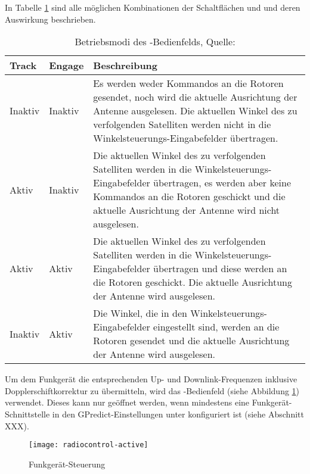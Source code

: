 In Tabelle \ref{tab:rotatorcontrolmodes} sind alle möglichen Kombinationen der Schaltflächen  und  und deren Auswirkung beschrieben.

\begin{table}[h]
	\begin{tabularx}{\textwidth}{|l|l|X|}
		\hline
		\textbf{Track} 	    & \textbf{Engage}	&\textbf{Beschreibung}\\
		\hline
		Inaktiv          	& Inaktiv 			& Es werden weder Kommandos an die Rotoren gesendet, noch wird die aktuelle Ausrichtung der Antenne ausgelesen. Die aktuellen Winkel des zu verfolgenden Satelliten werden nicht in die Winkelsteuerungs-Eingabefelder übertragen.\\
		Aktiv              	& Inaktiv   		& Die aktuellen Winkel des zu verfolgenden Satelliten werden in die Winkelsteuerungs-Eingabefelder übertragen, es werden aber keine Kommandos an die Rotoren geschickt und die aktuelle Ausrichtung der Antenne wird nicht ausgelesen.\\
		Aktiv              	& Aktiv	            & Die aktuellen Winkel des zu verfolgenden Satelliten werden in die Winkelsteuerungs-Eingabefelder übertragen und diese werden an die Rotoren geschickt. Die aktuelle Ausrichtung der Antenne wird ausgelesen.\\
		Inaktiv            	& Aktiv   			& Die Winkel, die in den Winkelsteuerungs-Eingabefelder eingestellt sind, werden an die Rotoren gesendet und die aktuelle Ausrichtung der Antenne wird ausgelesen.\\
		\hline		
	\end{tabularx}
	\caption{Betriebsmodi des -Bedienfelds, Quelle: \cite{gpredictmanual} \vspace{-2em}}
	\label{tab:rotatorcontrolmodes}
\end{table}

\clearpage

Um dem Funkgerät die entsprechenden Up- und Downlink-Frequenzen inklusive Dopplerschiftkorrektur zu übermitteln, wird das -Bedienfeld (siehe Abbildung \ref{fig:radiocontrol}) verwendet. Dieses kann nur geöffnet werden, wenn mindestens eine Funkgerät-Schnittstelle in den GPredict-Einstellungen unter  konfiguriert ist (siehe Abschnitt XXX).

\begin{figure}[h]
	\centering
	\texttt{[image: radiocontrol-active]}
	\caption{Funkgerät-Steuerung}
	\label{fig:radiocontrol} 
\end{figure}

